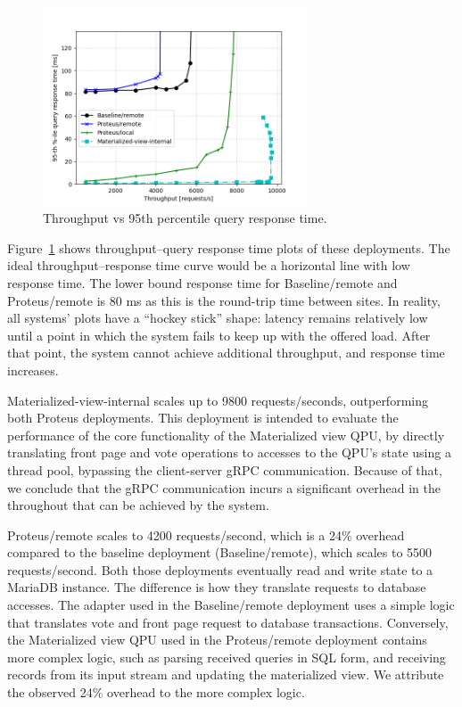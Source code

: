 \begin{figure}[H]
\centering
  \includegraphics[width=0.7\textwidth]{./figures/evaluation/responseTime.png}
  \caption{Throughput vs 95th percentile query response time.}
  \label{fig:responseTime}
\end{figure}

Figure~\ref{fig:responseTime} shows throughput--query response time plots of these deployments.
The ideal throughput--response time curve would be a horizontal line with low response time.
The lower bound response time for Baseline/remote and Proteus/remote is 80 ms as this is the round-trip time between sites.
In reality, all systems' plots have a ``hockey stick'' shape:
latency remains relatively low until a point in which the system fails to keep up with the offered load.
After that point, the system cannot achieve additional throughput, and response time increases.

Materialized-view-internal scales up to 9800 requests/seconds,
outperforming both Proteus deployments.
This deployment is intended to evaluate the performance of the core functionality of the Materialized view QPU,
by directly translating front page and vote operations to accesses to the QPU's state using a thread pool,
bypassing the client-server gRPC communication.
Because of that, we conclude that the gRPC communication incurs a significant overhead in the throughout that
can be achieved by the system.

Proteus/remote scales to 4200 requests/second, which is a 24\% overhead compared to the baseline deployment (Baseline/remote),
which scales to 5500 requests/second.
Both those deployments eventually read and write state to a MariaDB instance.
The difference is how they translate requests to database accesses.
The adapter used in the Baseline/remote deployment uses a simple logic that translates vote and front page request to database transactions.
Conversely, the Materialized view QPU used in the Proteus/remote deployment contains more complex logic,
such as parsing received queries in SQL form, and receiving records from its input stream and updating the materialized view.
We attribute the observed 24\% overhead to the more complex logic.

